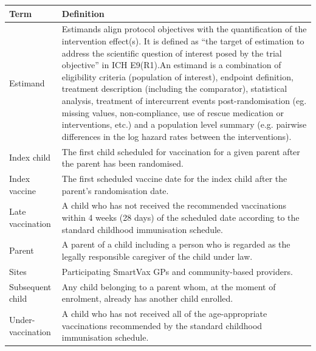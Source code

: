 \documentclass[
  bibliography=totoc]{scrreprt}
\begin{document}
\begin{table}[H]
\begin{tabular}{l>{\raggedright\arraybackslash}p{20em}}
\toprule
Term & Definition\\
\midrule
Estimand & Estimands align protocol objectives with the quantification of the intervention effect(s). \newline     It is defined as “the target of estimation to address the scientific question of interest posed by the trial objective” in ICH E9(R1).\newline \newline     An estimand is a combination of eligibility criteria (population of interest), endpoint definition, treatment description (including the comparator), statistical analysis, treatment of intercurrent events post-randomisation (eg. missing values, non-compliance, use of rescue medication or interventions, etc.) and a population level summary (e.g. pairwise differences in the log hazard rates between the interventions).\newline \\
Index child & The first child scheduled for vaccination for a given parent after the parent has been randomised.\newline \\
Index vaccine & The first scheduled vaccine date for the index child after the parent’s randomisation date.\newline \\
Late vaccination & A child who has not received the recommended vaccinations within 4 weeks (28 days) of the scheduled date according to the standard childhood immunisation schedule.\newline \\
Parent & A parent of a child including a person who is regarded as the legally responsible caregiver of the child under law.\newline \\
Sites & Participating SmartVax GPs and community-based providers.\newline \\
Subsequent child & Any child belonging to a parent whom, at the moment of enrolment, already has another child enrolled.\newline \\
Under-vaccination & A child who has not received all of the age-appropriate vaccinations recommended by the standard childhood immunisation schedule.\newline \\
\bottomrule
\end{tabular}
\endgroup{}
\end{table}
\end{document}
